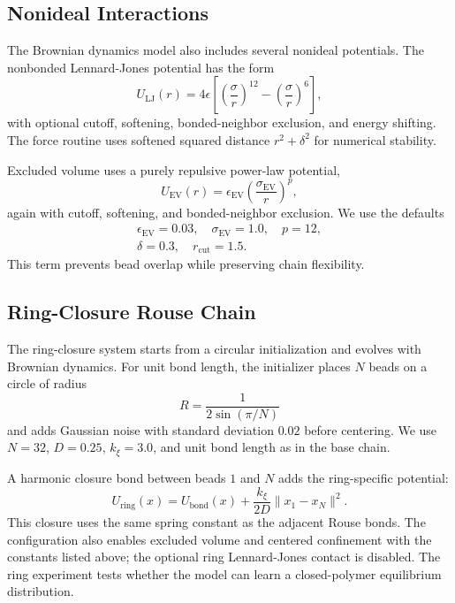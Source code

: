 \documentclass[reprint,amsmath,amssymb,aps,pra,10pt]{revtex4-2}
\begin{document}
\subsection*{Nonideal Interactions}

The Brownian dynamics model also includes several nonideal potentials.
The nonbonded Lennard-Jones potential has the form
\begin{equation}
    U_{\mathrm{LJ}}(r)
    =
    4\epsilon
    \left[
        \left(\frac{\sigma}{r}\right)^{12}
        -
        \left(\frac{\sigma}{r}\right)^6
    \right],
\end{equation}
with optional cutoff, softening, bonded-neighbor exclusion, and energy shifting.
The force routine uses softened squared distance $r^2+\delta^2$ for numerical stability.

Excluded volume uses a purely repulsive power-law potential,
\begin{equation}
    U_{\mathrm{EV}}(r)
    =
    \epsilon_{\mathrm{EV}}
    \left(
        \frac{\sigma_{\mathrm{EV}}}{r}
    \right)^{p},
\end{equation}
again with cutoff, softening, and bonded-neighbor exclusion.
We use the defaults
\begin{align}
    \epsilon_{\mathrm{EV}}=0.03,
    \quad
    \sigma_{\mathrm{EV}}=1.0,
    \quad
    p=12,
    \nonumber \\
    \delta=0.3,
    \quad
    r_{\mathrm{cut}}=1.5.
\end{align}
This term prevents bead overlap while preserving chain flexibility.

\subsection*{Ring-Closure Rouse Chain}

The ring-closure system starts from a circular initialization and evolves with Brownian dynamics.
For unit bond length, the initializer places $N$ beads on a circle of radius
\begin{equation}
    R
    =
    \frac{1}{2\sin(\pi/N)}
\end{equation}
and adds Gaussian noise with standard deviation $0.02$ before centering.
We use $N=32$, $D=0.25$, $k_\xi=3.0$, and unit bond length as in the base chain.

A harmonic closure bond between beads $1$ and $N$ adds the ring-specific potential:
\begin{equation}
    U_{\mathrm{ring}}(x)
    =
    U_{\mathrm{bond}}(x)
    +
    \frac{k_\xi}{2D}
    \|x_1-x_N\|^2.
\end{equation}
This closure uses the same spring constant as the adjacent Rouse bonds.
The configuration also enables excluded volume and centered confinement with the constants listed above; the optional ring Lennard-Jones contact is disabled.
The ring experiment tests whether the model can learn a closed-polymer equilibrium distribution.
\end{document}
